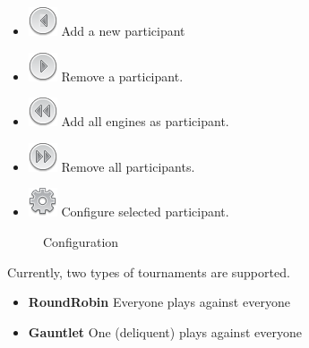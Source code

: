 \documentclass[11pt,a4paper]{article}
\begin{document}
\begin{itemize}
	\item \includegraphics[scale=0.5]{control_back.png} Add a new participant
	\item \includegraphics[scale=0.5]{control_play.png} Remove a participant. 
	\item \includegraphics[scale=0.5]{control_rewind.png} Add all engines as participant. 
	\item \includegraphics[scale=0.5]{control_fastforward.png} Remove all participants. 
    \item \includegraphics[scale=0.5]{cog.png} Configure selected participant. 
\end{itemize}

\begin{figure}[H]
	\centering
	\caption{Configuration}
	\label{fig:EngineTournament3}
\end{figure}

Currently, two types of tournaments are supported.
\begin{itemize}
	\item \textbf{RoundRobin} Everyone plays against everyone
	\item \textbf{Gauntlet} One (deliquent) plays against everyone
\end{itemize}
\end{document}
